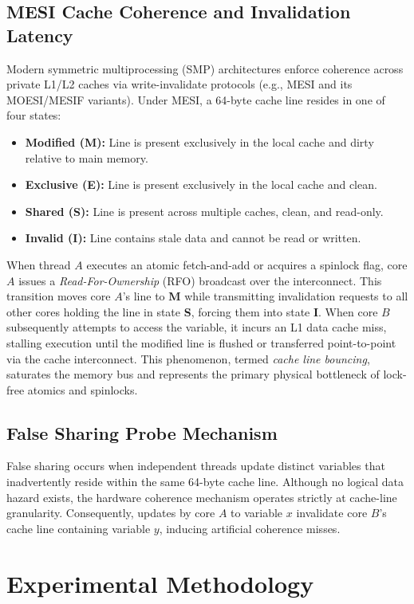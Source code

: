 \documentclass[conference]{IEEEtran}
\begin{document}
\subsection{MESI Cache Coherence and Invalidation Latency}
Modern symmetric multiprocessing (SMP) architectures enforce coherence across private L1/L2 caches via write-invalidate protocols (e.g., MESI and its MOESI/MESIF variants). Under MESI, a 64-byte cache line resides in one of four states:
\begin{itemize}
    \item \textbf{Modified (M):} Line is present exclusively in the local cache and dirty relative to main memory.
    \item \textbf{Exclusive (E):} Line is present exclusively in the local cache and clean.
    \item \textbf{Shared (S):} Line is present across multiple caches, clean, and read-only.
    \item \textbf{Invalid (I):} Line contains stale data and cannot be read or written.
\end{itemize}

When thread $A$ executes an atomic fetch-and-add or acquires a spinlock flag, core $A$ issues a \textit{Read-For-Ownership} (RFO) broadcast over the interconnect. This transition moves core $A$'s line to \textbf{M} while transmitting invalidation requests to all other cores holding the line in state \textbf{S}, forcing them into state \textbf{I}. When core $B$ subsequently attempts to access the variable, it incurs an L1 data cache miss, stalling execution until the modified line is flushed or transferred point-to-point via the cache interconnect. This phenomenon, termed \textit{cache line bouncing}, saturates the memory bus and represents the primary physical bottleneck of lock-free atomics and spinlocks.

\subsection{False Sharing Probe Mechanism}
False sharing occurs when independent threads update distinct variables that inadvertently reside within the same 64-byte cache line. Although no logical data hazard exists, the hardware coherence mechanism operates strictly at cache-line granularity. Consequently, updates by core $A$ to variable $x$ invalidate core $B$'s cache line containing variable $y$, inducing artificial coherence misses.

\section{Experimental Methodology}
\end{document}
